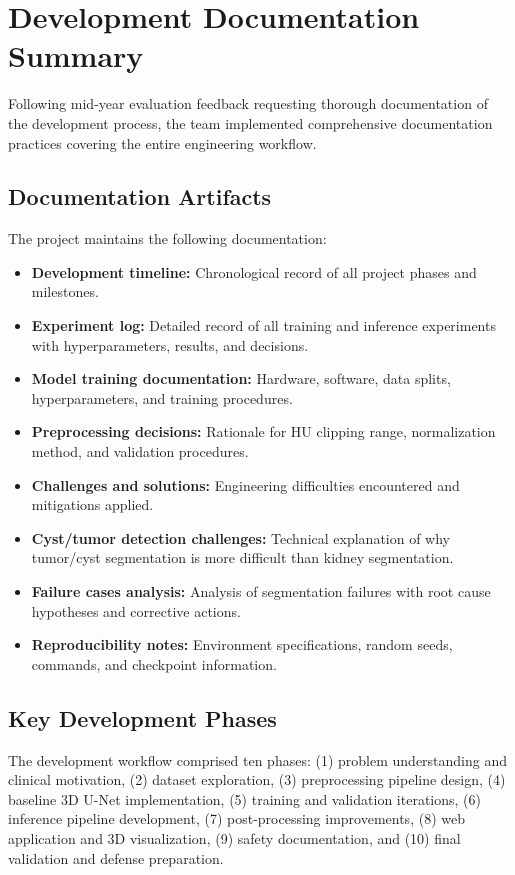 \section{Development Documentation Summary}

Following mid-year evaluation feedback requesting thorough documentation of the development process, the team implemented comprehensive documentation practices covering the entire engineering workflow.

\subsection{Documentation Artifacts}

The project maintains the following documentation:

\begin{itemize}
    \item \textbf{Development timeline:} Chronological record of all project phases and milestones.
    \item \textbf{Experiment log:} Detailed record of all training and inference experiments with hyperparameters, results, and decisions.
    \item \textbf{Model training documentation:} Hardware, software, data splits, hyperparameters, and training procedures.
    \item \textbf{Preprocessing decisions:} Rationale for HU clipping range, normalization method, and validation procedures.
    \item \textbf{Challenges and solutions:} Engineering difficulties encountered and mitigations applied.
    \item \textbf{Cyst/tumor detection challenges:} Technical explanation of why tumor/cyst segmentation is more difficult than kidney segmentation.
    \item \textbf{Failure cases analysis:} Analysis of segmentation failures with root cause hypotheses and corrective actions.
    \item \textbf{Reproducibility notes:} Environment specifications, random seeds, commands, and checkpoint information.
\end{itemize}

\subsection{Key Development Phases}

The development workflow comprised ten phases: (1) problem understanding and clinical motivation, (2) dataset exploration, (3) preprocessing pipeline design, (4) baseline 3D U-Net implementation, (5) training and validation iterations, (6) inference pipeline development, (7) post-processing improvements, (8) web application and 3D visualization, (9) safety documentation, and (10) final validation and defense preparation.

